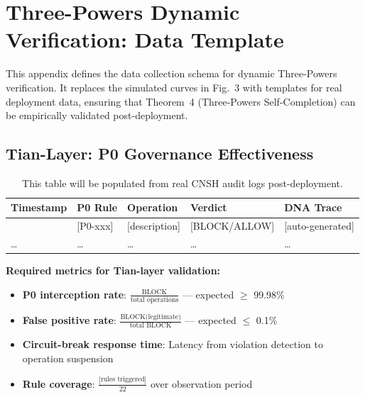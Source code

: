 
\section{Three-Powers Dynamic Verification: Data Template}
\label{app:dynamic-verification}

This appendix defines the data collection schema for dynamic
Three-Powers verification. It replaces the simulated curves in
Fig.~3 with templates for real deployment data, ensuring that
Theorem~4 (Three-Powers Self-Completion) can be empirically
validated post-deployment.

\subsection{Tian-Layer: P0 Governance Effectiveness}
\label{app:tian-data}

\begin{table}[h]
\centering
\caption{Tian-Layer P0 Violation Interception Log Template}
\renewcommand{\arraystretch}{1.3}
\begin{tabular}{llllp{3.5cm}}
\toprule
\textbf{Timestamp} & \textbf{P0 Rule} & \textbf{Operation} & \textbf{Verdict} & \textbf{DNA Trace} \\
\midrule
[auto] & [P0-xxx] & [description] & [BLOCK/ALLOW] & [auto-generated] \\
\ldots & \ldots & \ldots & \ldots & \ldots \\
\bottomrule
\end{tabular}
\caption*{This table will be populated from real CNSH audit logs post-deployment.}
\end{table}

\noindent \textbf{Required metrics for Tian-layer validation:}
\begin{itemize}
  \item \textbf{P0 interception rate}: $\frac{\text{BLOCK}}{\text{total operations}}$ — expected $\geq$ 99.98\%
  \item \textbf{False positive rate}: $\frac{\text{BLOCK(legitimate)}}{\text{total BLOCK}}$ — expected $\leq$ 0.1\%
  \item \textbf{Circuit-break response time}: Latency from violation detection to operation suspension
  \item \textbf{Rule coverage}: $\frac{|\text{rules triggered}|}{22}$ over observation period
\end{itemize}

